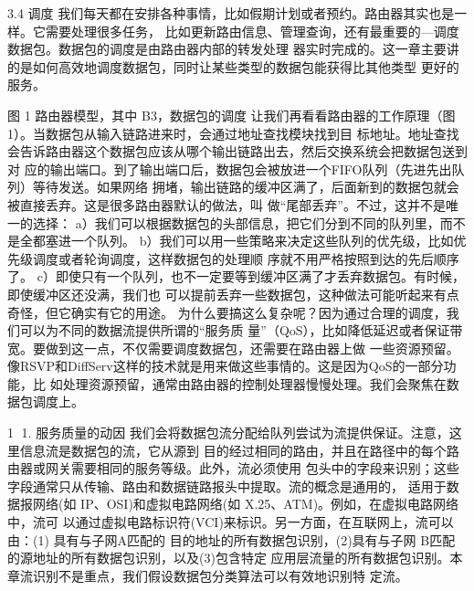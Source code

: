 
3.4 调度
 我们每天都在安排各种事情，比如假期计划或者预约。路由器其实也是一样。它需要处理很多任务，
比如更新路由信息、管理查询，还有最重要的—调度数据包。数据包的调度是由路由器内部的转发处理
器实时完成的。这一章主要讲的是如何高效地调度数据包，同时让某些类型的数据包能获得比其他类型
更好的服务。




              图 1 路由器模型，其中 B3，数据包的调度
  让我们再看看路由器的工作原理（图 1）。当数据包从输入链路进来时，会通过地址查找模块找到目
标地址。地址查找会告诉路由器这个数据包应该从哪个输出链路出去，然后交换系统会把数据包送到对
应的输出端口。到了输出端口后，数据包会被放进一个FIFO队列（先进先出队列）等待发送。如果网络
拥堵，输出链路的缓冲区满了，后面新到的数据包就会被直接丢弃。这是很多路由器默认的做法，叫
做“尾部丢弃”。不过，这并不是唯一的选择：
a）我们可以根据数据包的头部信息，把它们分到不同的队列里，而不是全都塞进一个队列。
b）我们可以用一些策略来决定这些队列的优先级，比如优先级调度或者轮询调度，这样数据包的处理顺
序就不用严格按照到达的先后顺序了。
c）即使只有一个队列，也不一定要等到缓冲区满了才丢弃数据包。有时候，即使缓冲区还没满，我们也
可以提前丢弃一些数据包，这种做法可能听起来有点奇怪，但它确实有它的用途。
  为什么要搞这么复杂呢？因为通过合理的调度，我们可以为不同的数据流提供所谓的“服务质
量”（QoS），比如降低延迟或者保证带宽。要做到这一点，不仅需要调度数据包，还需要在路由器上做
一些资源预留。像RSVP和DiffServ这样的技术就是用来做这些事情的。这是因为QoS的一部分功能，比
如处理资源预留，通常由路由器的控制处理器慢慢处理。我们会聚焦在数据包调度上。

                                                   1
1.   服务质量的动因
 我们会将数据包流分配给队列尝试为流提供保证。注意，这里信息流是数据包的流，它从源到
目的经过相同的路由，并且在路径中的每个路由器或网关需要相同的服务等级。此外，流必须使用
包头中的字段来识别；这些字段通常只从传输、路由和数据链路报头中提取。流的概念是通用的，
适用于数据报网络(如 IP、OSI)和虚拟电路网络(如 X.25、ATM)。例如，在虚拟电路网络中，流可
以通过虚拟电路标识符(VCI)来标识。另一方面，在互联网上，流可以由：(1) 具有与子网A匹配的
目的地址的所有数据包识别，(2)具有与子网 B匹配的源地址的所有数据包识别，以及(3)包含特定
应用层流量的所有数据包识别。本章流识别不是重点，我们假设数据包分类算法可以有效地识别特
定流。

